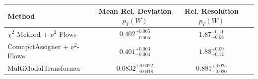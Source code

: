     \begin{tabular}{lccc}
        \toprule
        Method & Mean Rel. Deviation $p_{T}(W)$ & Rel. Resolution $p_{T}(W)$ \\
        \midrule
        $\chi^2$-Method + $\nu^2$-Flows & $0.402^{+0.005}_{-0.005}$ & $1.87^{+0.11}_{-0.08}$ \\
        ComapctAssigner + $\nu^2$-Flows & $0.401^{+0.003}_{-0.004}$ & $1.88^{+0.09}_{-0.12}$ \\
        MultiModalTransformer & $0.0832^{+0.0022}_{-0.0018}$ & $0.881^{+0.025}_{-0.020}$ \\
        \bottomrule
    \end{tabular}
